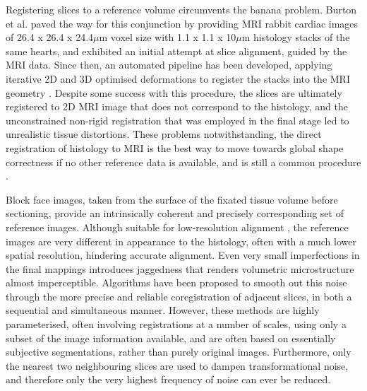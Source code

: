   Registering slices to a reference volume circumvents the banana problem. Burton et al. \cite{Burton2006} paved the way for this conjunction by providing MRI rabbit cardiac images of 26.4 x 26.4 x 24.4$\mu$m voxel size with 1.1 x 1.1 x 10$\mu$m histology stacks of the same hearts, and exhibited an initial attempt at slice alignment, guided by the MRI data. Since then, an automated pipeline has been developed, applying iterative 2D and 3D optimised deformations to register the stacks into the MRI geometry \cite{Mansoori2007}. Despite some success with this procedure, the slices are ultimately registered to 2D MRI image that does not correspond to the histology, and the unconstrained non-rigid registration that was employed in the final stage led to unrealistic tissue distortions. These problems notwithstanding, the direct registration of histology to MRI is the best way to move towards global shape correctness if no other reference data is available, and is still a common procedure \cite{Alic2011,Osechinskiy2011,Kimm2012}.
  
  Block face images, taken from the surface of the fixated tissue volume before sectioning, provide an intrinsically coherent and precisely corresponding set of reference images. Although suitable for low-resolution alignment  \cite{Palm2010}, the reference images are very different in appearance to the histology, often with a much lower spatial resolution, hindering accurate alignment. Even very small imperfections in the final mappings introduces jaggedness that renders volumetric microstructure almost imperceptible. Algorithms have been proposed to smooth out this noise through the more precise and reliable coregistration of adjacent slices, in both a sequential \cite{Yushkevich2006,Chakravarty2008} and simultaneous \cite{Feuerstein2011} manner. However, these methods are highly parameterised, often involving registrations at a number of scales, using only a subset of the image information available, and are often based on essentially subjective segmentations, rather than purely original images. Furthermore, only the nearest two neighbouring slices are used to dampen transformational noise, and therefore only the very highest frequency of noise can ever be reduced.
  
